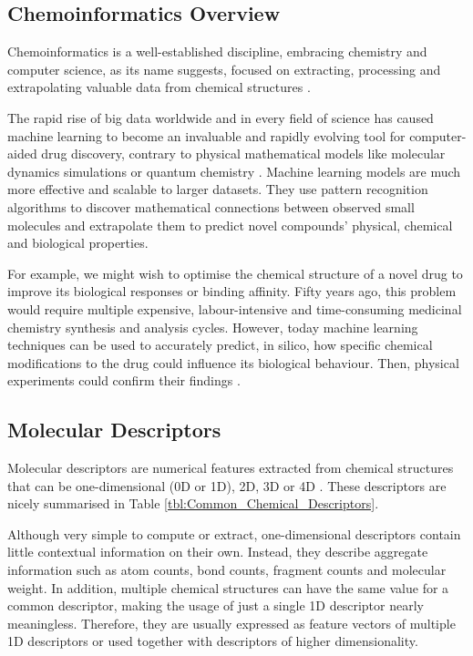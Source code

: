 \subsection{Chemoinformatics Overview}

Chemoinformatics is a well-established discipline, embracing chemistry and computer science, as its name suggests, focused on extracting, processing and extrapolating valuable data from chemical structures \citep{Lo2018}.

The rapid rise of big data worldwide and in every field of science has caused machine learning to become an invaluable and rapidly evolving tool for computer-aided drug discovery, contrary to physical mathematical models like molecular dynamics simulations or quantum chemistry \citep{Lo2018}. Machine learning models are much more effective and scalable to larger datasets. They use pattern recognition algorithms to discover mathematical connections between observed small molecules and extrapolate them to predict novel compounds' physical, chemical and biological properties.  

For example, we might wish to optimise the chemical structure of a novel drug to improve its biological responses or binding affinity. Fifty years ago, this problem would require multiple expensive, labour-intensive and time-consuming medicinal chemistry synthesis and analysis cycles. However, today machine learning techniques can be used to accurately predict, in silico, how specific chemical modifications to the drug could influence its biological behaviour. Then, physical experiments could confirm their findings \citep{Lo2018}.

\subsection{Molecular Descriptors}

Molecular descriptors are numerical features extracted from chemical structures that can be one-dimensional (0D or 1D), 2D, 3D or 4D \citep{Lo2018}. These descriptors are nicely summarised in Table \ref{tbl:Common_Chemical_Descriptors}.

Although very simple to compute or extract, one-dimensional descriptors contain little contextual information on their own. Instead, they describe aggregate information such as atom counts, bond counts, fragment counts and molecular weight. In addition, multiple chemical structures can have the same value for a common descriptor, making the usage of just a single 1D descriptor nearly meaningless. Therefore, they are usually expressed as feature vectors of multiple 1D descriptors or used together with descriptors of higher dimensionality.

